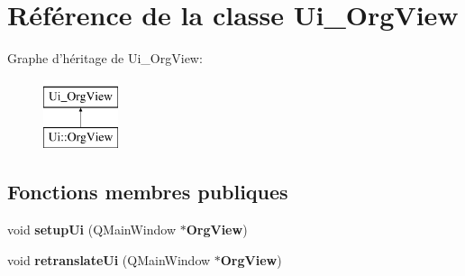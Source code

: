\section{Référence de la classe Ui\-\_\-\-Org\-View}
\label{class_ui___org_view}
Graphe d'héritage de Ui\-\_\-\-Org\-View\-:\begin{figure}[H]
\begin{center}
\leavevmode
\includegraphics[height=2.000000cm]{class_ui___org_view}
\end{center}
\end{figure}
\subsection*{Fonctions membres publiques}
\begin{DoxyCompactItemize}
\item 
void {\bfseries setup\-Ui} (Q\-Main\-Window $\ast${\bf Org\-View})\label{class_ui___org_view_a19e8f7a9520c4d8aa55dcf3d2e834cc0}

\item 
void {\bfseries retranslate\-Ui} (Q\-Main\-Window $\ast${\bf Org\-View})\label{class_ui___org_view_aae8a21e7f58f6f9dd7d8c63bb37e1ee6}

\end{DoxyCompactItemize}
